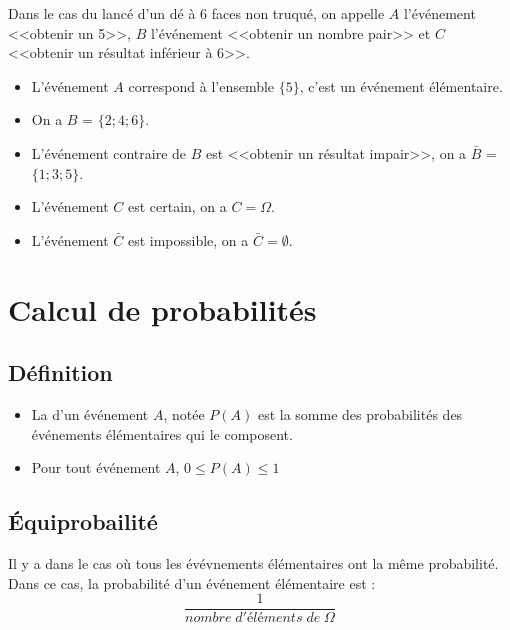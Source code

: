 \documentclass[12pt,a4paper]{article}
\begin{document}
\begin{myex}
	Dans le cas du lancé d'un dé à 6 faces non truqué, on appelle $A$ l'événement <<obtenir un 5>>, $B$ l'événement <<obtenir un nombre pair>> et $C$ <<obtenir un résultat inférieur à 6>>.
	\begin{itemize}
		\item L'événement $A$ correspond à l'ensemble $\{5\}$, c'est un événement élémentaire.
		\item On a $B$ = $\{2;4;6\}$.
		\item L'événement contraire de $B$ est <<obtenir un résultat impair>>, on a $\bar{B} $ = $\{1;3;5\}$.
		\item L'événement  $C$ est certain, on a $C=\Omega$.
		\item L'événement $\bar{C}$ est impossible, on a $\bar{C} = \emptyset$.
	\end{itemize}
\end{myex}

\section{Calcul de probabilités}

\subsection{Définition}

\begin{mydef}
	\begin{itemize}
		\item La  d'un événement $A$, notée $P(A)$ est la somme des probabilités des événements élémentaires qui le composent.
		\item Pour tout événement $A$, $0\leq P(A) \leq 1$
	\end{itemize}
	
\end{mydef}


\subsection{\'Equiprobailité}


\begin{mybilan}
	
		Il y a  dans le cas où tous les évévnements élémentaires ont la même probabilité.
		Dans ce cas, la probabilité d'un événement élémentaire est :
		\begin{equation*}
			\dfrac{1}{nombre\; d'éléments\; de\; \Omega}
		\end{equation*}


\end{mybilan}
\end{document}
